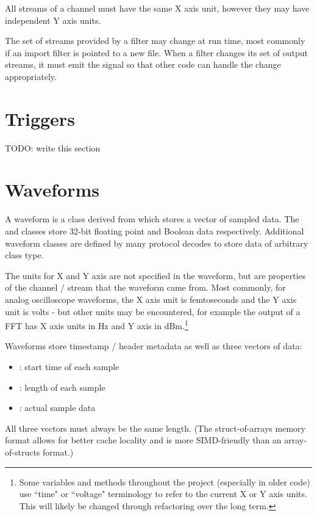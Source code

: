 All streams of a channel must have the same X axis unit, however they may have independent Y axis units.

The set of streams provided by a filter may change at run time, most commonly if an import filter is pointed to a new
file. When a filter changes its set of output streams, it must emit the  signal so
that other code can handle the change appropriately.

\section{Triggers}
\label{sec:triggers}

TODO: write this section

\section{Waveforms}
\label{sec:waveforms}

A waveform is a class derived from  which stores a vector of sampled data. The
 and  classes store 32-bit floating point and Boolean data
respectively. Additional waveform classes are defined by many protocol decodes to store data of arbitrary class type.

The units for X and Y axis are not specified in the waveform, but are properties of the channel / stream that the
waveform came from. Most commonly, for analog oscilloscope waveforms, the X axis unit is femtoseconds and the Y axis
unit is volts - but other units may be encountered, for example the output of a FFT has X axis units in Hz and Y axis
in dBm.\footnote{Some variables and methods throughout the project (especially in older code) use ``time" or
``voltage" terminology to refer to the current X or Y axis units. This will likely be changed through refactoring over
the long term.}

Waveforms store timestamp / header metadata as well as three vectors of data:

\begin{itemize}
\item {}: start time of each sample
\item {}: length of each sample
\item {}: actual sample data
\end{itemize}

All three vectors must always be the same length. (The struct-of-arrays memory format allows for better cache locality
and is more SIMD-friendly than an array-of-structs format.)

